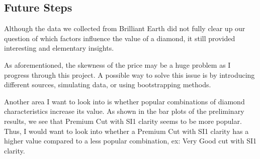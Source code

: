 \documentclass[
]{article}
\begin{document}
\hypertarget{future-steps}{%
\subsection{Future Steps}\label{future-steps}}

Although the data we collected from Brilliant Earth did not fully clear
up our question of which factors influence the value of a diamond, it
still provided interesting and elementary insights.

As aforementioned, the skewness of the price may be a huge problem as I
progress through this project. A possible way to solve this issue is by
introducing different sources, simulating data, or using bootstrapping
methods.

Another area I want to look into is whether popular combinations of
diamond characteristics increase its value. As shown in the bar plots of
the preliminary results, we see that Premium Cut with SI1 clarity seems
to be more popular. Thus, I would want to look into whether a Premium
Cut with SI1 clarity has a higher value compared to a less popular
combination, ex: Very Good cut with SI1 clarity.
\end{document}
